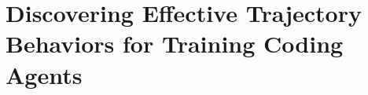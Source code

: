 





































\chapter{Discovering Effective Trajectory Behaviors for Training Coding Agents}
\label{chap:effective-analysis}



